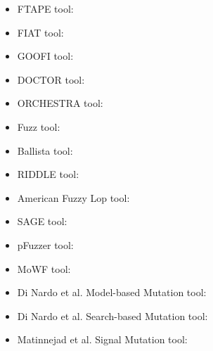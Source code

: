 
\newcommand{\FTAPE}{\cite{tsai1999stress}}
\newcommand{\FIAT}{\cite{barton1990fault}}
\newcommand{\GOOFI}{\cite{aidemark2001goofi}}
\newcommand{\DOCTOR}{\cite{han1995doctor}}
\newcommand{\ORCHESTRA}{\cite{dawson1996testing}}
\newcommand{\Fuzz}{\cite{miller1995fuzz}}
\newcommand{\Ballista}{\cite{koopman2000exception}}
\newcommand{\RIDDLE}{\cite{ghosh1998testing}}
\newcommand{\AFL}{\cite{gutmann2016fuzzing}}
\newcommand{\SAGE}{\cite{godefroid2012sage}}
\newcommand{\pFuzzer}{\cite{mathis2019parser}} 
\newcommand{\MoWF}{\cite{pham2016model}}
\newcommand{\DiNardoICST}{\cite{di2015generating}}
\newcommand{\DiNardoASE}{\cite{di2015evolutionary}}
\newcommand{\Matinnejad}{\cite{Matinnejad19}}

\begin{itemize}
	\item FTAPE tool: \cite{tsai1999stress}
	\item FIAT tool: \cite{barton1990fault}
	\item GOOFI tool: \cite{aidemark2001goofi}
	\item DOCTOR tool: \cite{han1995doctor}
	\item ORCHESTRA tool: \cite{dawson1996testing}
	\item Fuzz tool:\cite{miller1995fuzz}
	\item Ballista tool: \cite{koopman2000exception}
	\item RIDDLE tool: \cite{ghosh1998testing}
	\item American Fuzzy Lop tool: \cite{gutmann2016fuzzing}
	\item SAGE tool: \cite{godefroid2012sage}
	\item pFuzzer tool: \cite{mathis2019parser}
	\item MoWF tool: \cite{pham2016model}
	\item Di Nardo et al. Model-based Mutation tool: \cite{di2015generating}
	\item Di Nardo et al. Search-based Mutation tool: \cite{di2015evolutionary}
	\item Matinnejad et al. Signal Mutation tool: \cite{Matinnejad19}
\end{itemize}

